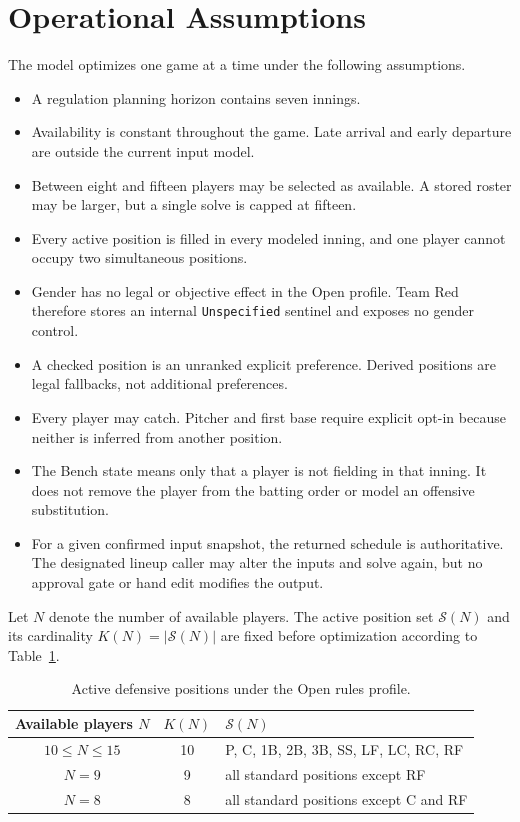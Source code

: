 \documentclass[11pt]{article}
\newcommand{\code}[1]{\texttt{#1}}
\begin{document}
\section{Operational Assumptions}

The model optimizes one game at a time under the following assumptions.
\begin{itemize}
    \item A regulation planning horizon contains seven innings.
    \item Availability is constant throughout the game. Late arrival and
    early departure are outside the current input model.
    \item Between eight and fifteen players may be selected as available.
    A stored roster may be larger, but a single solve is capped at fifteen.
    \item Every active position is filled in every modeled inning, and one
    player cannot occupy two simultaneous positions.
    \item Gender has no legal or objective effect in the Open profile.
    Team Red therefore stores an internal \code{Unspecified} sentinel and
    exposes no gender control.
    \item A checked position is an unranked explicit preference. Derived
    positions are legal fallbacks, not additional preferences.
    \item Every player may catch. Pitcher and first base require explicit
    opt-in because neither is inferred from another position.
    \item The Bench state means only that a player is not fielding in that
    inning. It does not remove the player from the batting order or model an
    offensive substitution.
    \item For a given confirmed input snapshot, the returned schedule is
    authoritative. The designated lineup caller may alter the inputs and solve
    again, but no approval gate or hand edit modifies the output.
\end{itemize}

Let $N$ denote the number of available players. The active position set
$\mathcal S(N)$ and its cardinality $K(N)=|\mathcal S(N)|$ are fixed before
optimization according to Table~\ref{tab:active-positions}.

\begin{table}[htbp]
\centering
\caption{Active defensive positions under the Open rules profile.}
\label{tab:active-positions}
\begin{tabular}{ccl}
\toprule
Available players $N$ & $K(N)$ & $\mathcal S(N)$\\
\midrule
$10\leq N\leq15$ & 10 & P, C, 1B, 2B, 3B, SS, LF, LC, RC, RF\\
$N=9$ & 9 & all standard positions except RF\\
$N=8$ & 8 & all standard positions except C and RF\\
\bottomrule
\end{tabular}
\end{table}
\end{document}
